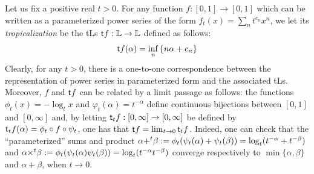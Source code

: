 Let us fix a positive real $t>0$. For any function $f:[0,1]\to [0,1]$ which can be written as a parameterized {power series} of the form $f_{t}(x)= \sum_{n}t^{c_{n}}x^{n}$, 
  we let its \emph{tropicalization} be the tLs $\mathsf{t} f: \mathbb{L} \to \mathbb{L}$ defined as follows:
\begin{align}\label{eq:defTLS}
\trop f(\alpha) =\inf_{n}\left\{ n\alpha+c_{n}\right\}
\end{align}
Clearly, for any $t>0$, there is a one-to-one correspondence between the representation of power series in parameterized form and the associated tLs. Moreover, 
$f$ and $\mathsf{t} f$ can be related by a limit passage as follows: the functions $\phi_{t}(x)= -\log_{t}x$ and $\varphi_{t}(\alpha)= t^{-\alpha}$ define continuous bijections between $[0,1]$ and $[0,\infty]$ and, by letting
$\mathsf{t} _{t}f: [0,\infty]\to [0,\infty]$ be defined by 
$\mathsf{t} _{t}f(\alpha)= \phi_{t}\circ f \circ \psi_{t}$, one has that 
$\mathsf{t} f= \lim_{t\to 0}\mathsf{t} _{t}f$. 
Indeed, one can check that the ``parameterized'' sums and product $\alpha {+}^{t}\beta:= \phi_{t}(\psi_{t}(\alpha)+\psi_{t}(\beta))= \log_{t}(t^{-\alpha}+t^{-\beta})$ and 
$\alpha {\times}^{t}\beta:= \phi_{t}( \psi_{t}(\alpha)\psi_{t}(\beta))=
\log_{t}(t^{-\alpha}t^{-\beta})$ converge respectively to $\min\{\alpha,\beta\}$ and $\alpha+\beta$, when $t\to 0$.

